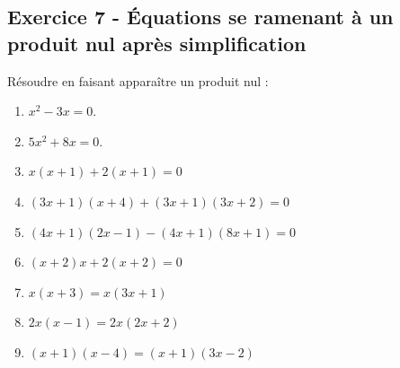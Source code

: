 \documentclass[14 pt]{extarticle}
\renewcommand\it\item
\theoremstyle{plain}
\begin{document}
  \subsection*{Exercice 7 - Équations se ramenant à un produit nul après simplification}
  Résoudre en faisant apparaître un produit nul : 
  \begin{enumerate}
\it $x^2-3x=0$. 
\it $5x^2+8x=0$. 
\it $x(x+1) + 2(x+1) = 0$
\it $(3x+1)(x+4) + (3x+1)(3x+2) =0$
\it $(4x+1)(2x-1)-(4x+1)(8x+1)=0$
\it $(x+2)x +2(x+2)=0$
\it $x(x+3) = x(3x+1)$
\it $2x(x-1) = 2x(2x+2)$
\it $(x+1)(x-4) = (x+1)(3x-2)$

  \end{enumerate}
  
  
  
  
  
  
 	
\end{document}
